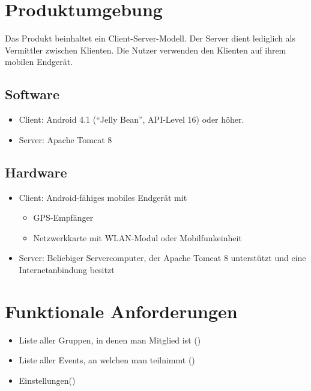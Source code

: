 \documentclass[parskip=full,11pt]{scrartcl}
\begin{document}
\section{Produktumgebung}
Das Produkt beinhaltet ein Client-Server-Modell.
Der Server dient lediglich als Vermittler zwischen Klienten.
Die Nutzer verwenden den Klienten auf ihrem mobilen Endgerät.
\subsection{Software}
\begin{itemize}
    \item Client: Android 4.1 (\enquote{Jelly Bean}, API-Level 16) oder
        höher.
    \item Server: Apache Tomcat 8
\end{itemize}

\subsection{Hardware}
\begin{itemize}
    \item Client: Android-fähiges mobiles Endgerät mit
        \begin{itemize}
            \item GPS-Empfänger
            \item Netzwerkkarte mit WLAN-Modul oder Mobilfunkeinheit
        \end{itemize}
    \item Server: Beliebiger Servercomputer, der Apache Tomcat 8 unterstützt
        und eine Internetanbindung besitzt
\end{itemize}

\section{Funktionale Anforderungen}

\begin{itemize}
    \item Liste aller Gruppen, in denen man Mitglied ist ()
    \item Liste aller Events, an welchen man teilnimmt ()
    \item Einstellungen()
\end{itemize}
\end{document}
